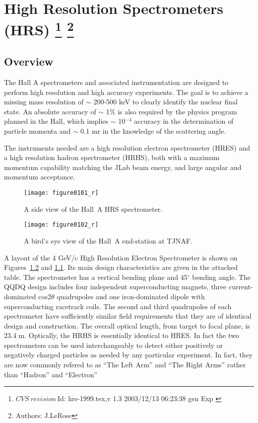 \chapter[High Resolution Spectrometers (HRS)]{High Resolution Spectrometers (HRS)
\footnote{
  $CVS~revision~ $Id: hrs-1999.tex,v 1.3 2003/12/13 06:23:38 gen Exp $ $ 
}
\footnote{Authors: J.LeRose }
}
\label{chap:hrs}
\section{Overview}
   
The Hall A spectrometers and associated instrumentation are designed to 
perform high resolution and high accuracy experiments.  The goal is to 
achieve a missing mass resolution of $\sim$ 200-500 keV to clearly 
identify the nuclear final state.  An absolute accuracy of $\sim$ 1\% is 
also required by the physics program planned in the Hall, which implies 
$\sim$ 10$^{-4}$ accuracy in the determination of particle momenta and 
$\sim$ 0.1 mr in the knowledge of the scattering angle.

The instruments needed are a high resolution electron spectrometer 
(HRES) and a high resolution hadron spectrometer (HRHS), both with a 
maximum momentum capability matching the JLab beam energy, and large 
angular and momentum acceptance.

\begin{figure}[tbp]
\begin{center}
\texttt{[image: figure0101\_r]}
\caption[Spectrometers: Elevation View of Hall~A HRS]{A side view of the Hall~A
HRS spectrometer.}  
\label{fig:hrs_ev}
\end{center}
\end{figure}
 
\begin{figure}[tbp]
\begin{center}
\texttt{[image: figure0102\_r]}
\caption[Spectrometers: Plan View of Hall~A]{A bird's eye view of the Hall~A
end-station at TJNAF.}  
\label{fig:hrs_pv}
\end{center}
\end{figure}


A layout of the 4 GeV/c High Resolution Electron Spectrometer is shown 
on Figures~\ref{fig:hrs_pv} and \ref{fig:hrs_ev}.
Its main design characteristics are 
given in the attached table.  The spectrometer has a vertical bending 
plane and 45$^{\circ}$ bending angle.  The QQDQ design includes four 
independent superconducting magnets, three current-dominated 
cos2$\theta $ quadrupoles and one iron-dominated dipole with 
superconducting racetrack coils.  The second and third quadrupoles of 
each spectrometer have sufficiently similar field requirements that they 
are of identical design and construction.  The overall optical length, 
from target to focal plane, is 23.4 m.  Optically, the HRHS 
is essentially identical to HRES. In fact the two spectrometers can be used 
interchangeably to detect either positively or negatively charged particles 
as needed by any particular experiment. In fact, they are now commonly refered to 
as ``The Left Arm'' and ``The Right Arms'' rather than ``Hadron'' and ``Electron'' 


